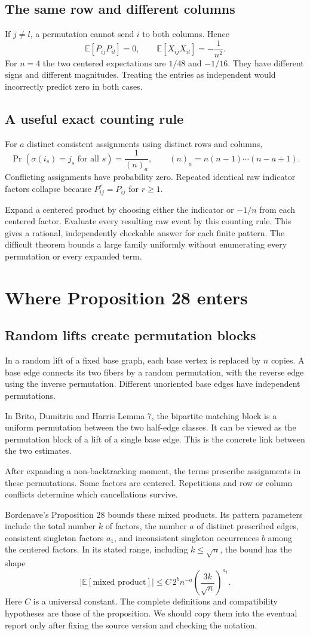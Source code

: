 \documentclass[11pt,letterpaper]{article}
\newcommand{\Page}[1]{\clearpage\section*{#1}}
\newcommand{\Sub}[1]{\subsection*{#1}}
\newcommand{\E}{\mathbb E}
\begin{document}
\Sub{The same row and different columns}
If $j\ne l$, a permutation cannot send $i$ to both columns. Hence
\[
 \E[P_{ij}P_{il}]=0,\qquad
 \E[X_{ij}X_{il}]=-\frac{1}{n^2}.
\]
For $n=4$ the two centered expectations are $1/48$ and $-1/16$. They have different signs and different magnitudes. Treating the entries as independent would incorrectly predict zero in both cases.

\Sub{A useful exact counting rule}
For $a$ distinct consistent assignments using distinct rows and columns,
\[
 \Pr(\sigma(i_s)=j_s\text{ for all }s)
 =\frac{1}{(n)_a},\qquad (n)_a=n(n-1)\cdots(n-a+1).
\]
Conflicting assignments have probability zero. Repeated identical raw indicator factors collapse because $P_{ij}^r=P_{ij}$ for $r\geq1$.

Expand a centered product by choosing either the indicator or $-1/n$ from each centered factor. Evaluate every resulting raw event by this counting rule. This gives a rational, independently checkable answer for each finite pattern. The difficult theorem bounds a large family uniformly without enumerating every permutation or every expanded term.

\Page{Where Proposition 28 enters}
\Sub{Random lifts create permutation blocks}
In a random lift of a fixed base graph, each base vertex is replaced by $n$ copies. A base edge connects its two fibers by a random permutation, with the reverse edge using the inverse permutation. Different unoriented base edges have independent permutations.

In Brito, Dumitriu and Harris Lemma 7, the bipartite matching block is a uniform permutation between the two half-edge classes. It can be viewed as the permutation block of a lift of a single base edge. This is the concrete link between the two estimates.

After expanding a non-backtracking moment, the terms prescribe assignments in these permutations. Some factors are centered. Repetitions and row or column conflicts determine which cancellations survive.

Bordenave's Proposition 28 bounds these mixed products. Its pattern parameters include the total number $k$ of factors, the number $a$ of distinct prescribed edges, consistent singleton factors $a_1$, and inconsistent singleton occurrences $b$ among the centered factors. In its stated range, including $k\leq\sqrt n$, the bound has the shape
\[
 |\E[\text{mixed product}]|
 \leq C\,2^b n^{-a}\left(\frac{3k}{\sqrt n}\right)^{a_1}.
\]
Here $C$ is a universal constant. The complete definitions and compatibility hypotheses are those of the proposition. We should copy them into the eventual report only after fixing the source version and checking the notation.
\end{document}
